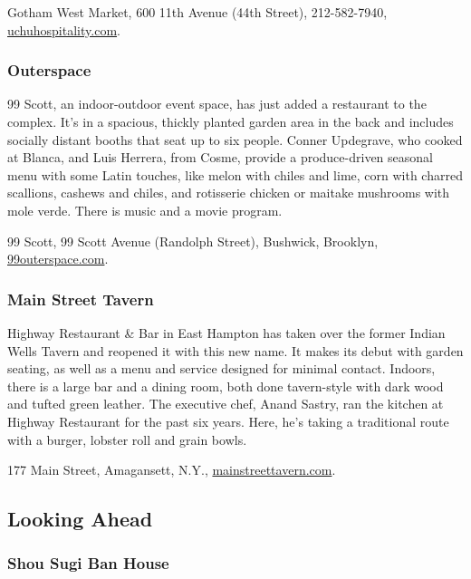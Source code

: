 Gotham West Market, 600 11th Avenue (44th Street), 212-582-7940,
\href{https://uchuhospitality.com}{uchuhospitality.com}.

\hypertarget{outerspace}{%
\subsubsection{Outerspace}\label{outerspace}}

99 Scott, an indoor-outdoor event space, has just added a restaurant to
the complex. It's in a spacious, thickly planted garden area in the back
and includes socially distant booths that seat up to six people. Conner
Updegrave, who cooked at Blanca, and Luis Herrera, from Cosme, provide a
produce-driven seasonal menu with some Latin touches, like melon with
chiles and lime, corn with charred scallions, cashews and chiles, and
rotisserie chicken or maitake mushrooms with mole verde. There is music
and a movie program.

99 Scott, 99 Scott Avenue (Randolph Street), Bushwick, Brooklyn,
\href{https://99outerspace.com}{99outerspace.com}.

\hypertarget{main-street-tavern-}{%
\subsubsection{Main Street Tavern }\label{main-street-tavern-}}

Highway Restaurant \& Bar in East Hampton has taken over the former
Indian Wells Tavern and reopened it with this new name. It makes its
debut with garden seating, as well as a menu and service designed for
minimal contact. Indoors, there is a large bar and a dining room, both
done tavern-style with dark wood and tufted green leather. The executive
chef, Anand Sastry, ran the kitchen at Highway Restaurant for the past
six years. Here, he's taking a traditional route with a burger, lobster
roll and grain bowls.

177 Main Street, Amagansett, N.Y.,
\href{https://www.mainstreettavern.com/}{mainstreettavern.com}.

\hypertarget{looking-ahead}{%
\subsection{Looking Ahead}\label{looking-ahead}}

\hypertarget{shou-sugi-ban-house-}{%
\subsubsection{Shou Sugi Ban House }\label{shou-sugi-ban-house-}}

